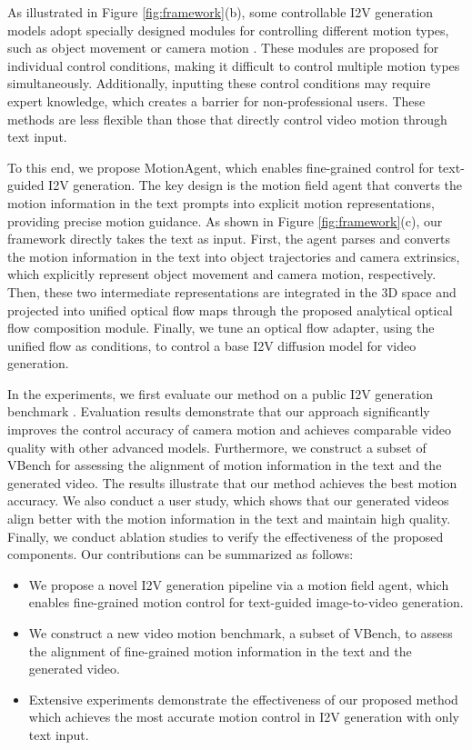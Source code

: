 As illustrated in Figure \ref{fig:framework}(b), some controllable I2V generation models adopt specially designed modules for controlling different motion types, such as object movement \cite{wang2024motionctrl,yin2023dragnuwa,wu2025draganything,zhou2024trackgo,zhang2024tora,niu2024mofa,wu2024motionbooth} or camera motion \cite{he2024cameractrl,xu2024cavia,xu2024camco}. These modules are proposed for individual control conditions, making it difficult to control multiple motion types simultaneously. Additionally, inputting these control conditions may require expert knowledge, which creates a barrier for non-professional users. These methods are less flexible than those that directly control video motion through text input.

To this end, we propose MotionAgent, which enables fine-grained control for text-guided I2V generation. The key design is the motion field agent that converts the motion information in the text prompts into explicit motion representations, providing precise motion guidance. As shown in Figure \ref{fig:framework}(c), our framework directly takes the text as input. First, the agent parses and converts the motion information in the text into object trajectories and camera extrinsics, which explicitly represent object movement and camera motion, respectively. Then, these two intermediate representations are integrated in the 3D space and projected into unified optical flow maps through the proposed analytical optical flow composition module. Finally, we tune an optical flow adapter, using the unified flow as conditions, to control a base I2V diffusion model for video generation.

In the experiments, we first evaluate our method on a public I2V generation benchmark \cite{huang2024vbench}. Evaluation results demonstrate that our approach significantly improves the control accuracy of camera motion and achieves comparable video quality with other advanced models. Furthermore, we construct a subset of VBench for assessing the alignment of motion information in the text and the generated video. The results illustrate that our method achieves the best motion accuracy. We also conduct a user study, which shows that our generated videos align better with the motion information in the text and maintain high quality. Finally, we conduct ablation studies to verify the effectiveness of the proposed components. Our contributions can be summarized as follows:
\begin{itemize}
    \item We propose a novel I2V generation pipeline via a motion field agent, which enables fine-grained motion control for text-guided image-to-video generation.
    \item We construct a new video motion benchmark, a subset of VBench, to assess the alignment of fine-grained motion information in the text and the generated video.
    \item Extensive experiments demonstrate the effectiveness of our proposed method which achieves the most accurate motion control in I2V generation with only text input.
\end{itemize}

